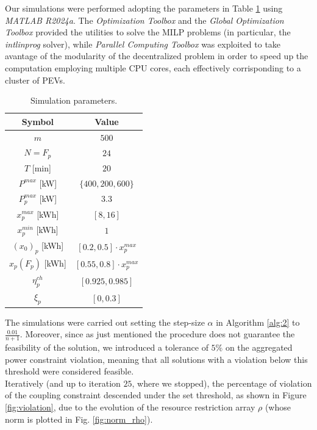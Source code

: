 Our simulations were performed adopting the parameters in Table \ref{tab:sim_param} using \textit{MATLAB R2024a}. The \textit{Optimization Toolbox} and the \textit{Global Optimization Toolbox} provided the utilities to solve the MILP problems (in particular, the \textit{intlinprog} solver), while \textit{Parallel Computing Toolbox} was exploited to take avantage of the modularity of the decentralized problem in order to speed up the computation employing multiple CPU cores, each effectively corrisponding to a cluster of PEVs.

\begin{table}[H]
    \centering
    \begin{tabular}{|c|c|}
        \hline
        Symbol & Value \\
        \hline
        $m$ & $500$ \\
        $N = F_p$ & $24$ \\
        $T$ [min] & $20$ \\
        $P^{max}$ [kW] & $\{400, 200, 600\}$ \\
        $P^{max}_p$ [kW] & $3.3$ \\
        $x^{max}_p$ [kWh] & $[8, 16]$ \\
        $x^{min}_p$ [kWh] & $1$ \\
        $(x_0)_p$ [kWh] & $[0.2, 0.5] \cdot x^{max}_p$ \\
        $x_p(F_p)$ [kWh] & $[0.55, 0.8] \cdot x^{max}_p$ \\
        $\eta^{ch}_p$ & $[0.925, 0.985]$ \\
        $\xi_p$ & $[0, 0.3]$ \\
        \hline
    \end{tabular}
    \caption{Simulation parameters.}
    \label{tab:sim_param}
\end{table}

\noindent The simulations were carried out setting the step-size $\alpha$ in Algorithm \ref{alg:2} to $\frac{0.01}{n+1}$. Moreover, since as just mentioned the procedure does not guarantee the feasibility of the solution, we introduced a tolerance of $5\%$ on the aggregated power constraint violation, meaning that all solutions with a violation below this threshold were considered feasible.\\
Iteratively (and up to iteration $25$, where we stopped), the percentage of violation of the coupling constraint descended under the set threshold, as shown in Figure \ref{fig:violation}, due to the evolution of the resource restriction array $\rho$ (whose norm is plotted in Fig. \ref{fig:norm_rho}). 

